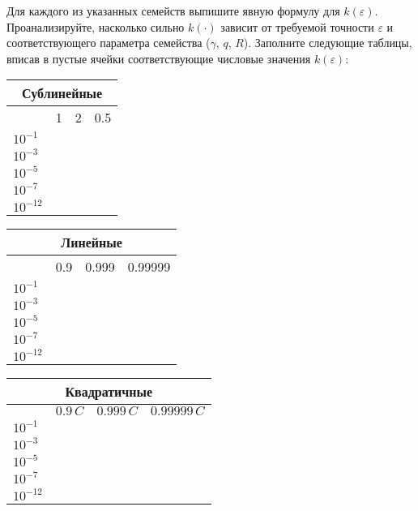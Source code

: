 \documentclass{article}
\renewcommand{\epsilon}{\varepsilon} %
\begin{document}
\begin{enumerate}[label=\textbf{\arabic*}, leftmargin=0em]
Для каждого из указанных семейств выпишите явную формулу для $k(\epsilon)$. Проанализируйте, насколько сильно $k(\cdot)$ зависит от требуемой точности $\epsilon$ и соответствующего параметра семейства ($\gamma$, $q$, $R$). Заполните следующие таблицы, вписав в пустые ячейки соответствующие числовые значения $k(\epsilon)$:
\begin{multicols}{3}
	
	\begin{tabular}{|l|l|l|l|}\hline
		\multicolumn{4}{|c|}{Сублинейные} \\ \hline
		\multicolumn{1}{|c|}{\diagbox{$\epsilon$}{$\gamma$}} & \multicolumn{1}{c|}{1} & \multicolumn{1}{c|}{2} & \multicolumn{1}{c|}{0.5} \\ \hline
		$10^{-1}$ & \hphantom{$1000$} & \hphantom{$1000$} & \hphantom{$1000$} \\ \hline
		$10^{-3}$ & & & \\ \hline
		$10^{-5}$ & & & \\ \hline
		$10^{-7}$ & & & \\ \hline
		$10^{-12}$ & & & \\ \hline
	\end{tabular}
	\columnbreak
	
	\hspace{-0.5em}\begin{tabular}{|l|l|l|l|}\hline
		\multicolumn{4}{|c|}{Линейные} \\ \hline
		\multicolumn{1}{|c|}{\diagbox{$\epsilon$}{$q$}} & \multicolumn{1}{c|}{0.9} & \multicolumn{1}{c|}{0.999} & \multicolumn{1}{c|}{0.99999} \\ \hline
		$10^{-1}$ & \hphantom{$1000$} & \hphantom{$1000$} & \hphantom{$1000$} \\ \hline
		$10^{-3}$ & & & \\ \hline
		$10^{-5}$ & & & \\ \hline
		$10^{-7}$ & & & \\ \hline
		$10^{-12}$ & & & \\ \hline
	\end{tabular}
	\columnbreak
	
	\begin{flushright}
		\begin{tabular}{|l|l|l|l|} \hline
			\multicolumn{4}{|c|}{Квадратичные} \\ \hline
			\multicolumn{1}{|c|}{\diagbox{$\epsilon$}{$R$}} & \multicolumn{1}{c|}{$0.9 \, C$} & \multicolumn{1}{c|}{$0.999 \, C$} & \multicolumn{1}{c|}{$0.99999 \, C$} \\ \hline
			$10^{-1}$ & \hphantom{$1000$} & \hphantom{$1000$} & \hphantom{$1000$} \\ \hline
			$10^{-3}$ & & & \\ \hline
			$10^{-5}$ & & & \\ \hline
			$10^{-7}$ & & & \\ \hline
			$10^{-12}$ & & & \\ \hline
		\end{tabular}
	\end{flushright}
	

\end{multicols}
\end{enumerate}
\end{document}
